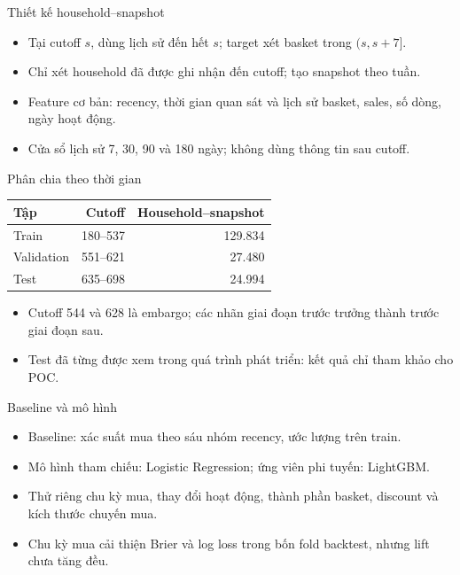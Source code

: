 \documentclass[aspectratio=169,10pt]{beamer}
\begin{document}
\begin{frame}{Thiết kế household--snapshot}
\begin{itemize}
  \item Tại cutoff $s$, dùng lịch sử đến hết $s$; target xét basket trong $(s,s+7]$.
  \item Chỉ xét household đã được ghi nhận đến cutoff; tạo snapshot theo tuần.
  \item Feature cơ bản: recency, thời gian quan sát và lịch sử basket, sales, số dòng, ngày hoạt động.
  \item Cửa sổ lịch sử 7, 30, 90 và 180 ngày; không dùng thông tin sau cutoff.
\end{itemize}
\end{frame}

\begin{frame}{Phân chia theo thời gian}
\begin{center}
\begin{tabular}{lrr}
\toprule
Tập & Cutoff & Household--snapshot \\
\midrule
Train & 180--537 & 129.834 \\
Validation & 551--621 & 27.480 \\
Test & 635--698 & 24.994 \\
\bottomrule
\end{tabular}
\end{center}
\begin{itemize}
  \item Cutoff 544 và 628 là embargo; các nhãn giai đoạn trước trưởng thành trước giai đoạn sau.
  \item Test đã từng được xem trong quá trình phát triển: kết quả chỉ tham khảo cho POC.
\end{itemize}
\end{frame}

\begin{frame}{Baseline và mô hình}
\begin{itemize}
  \item Baseline: xác suất mua theo sáu nhóm recency, ước lượng trên train.
  \item Mô hình tham chiếu: Logistic Regression; ứng viên phi tuyến: LightGBM.
  \item Thử riêng chu kỳ mua, thay đổi hoạt động, thành phần basket, discount và kích thước chuyến mua.
  \item Chu kỳ mua cải thiện Brier và log loss trong bốn fold backtest, nhưng lift chưa tăng đều.
\end{itemize}
\end{frame}
\end{document}
